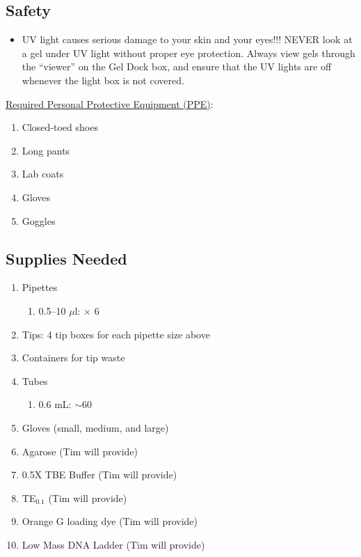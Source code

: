\documentclass[12pt, hidelinks]{article}
\begin{document}
	\subsection{Safety}
		\begin{itemize}
			\item UV light causes serious damage to your skin and your eyes!!!  NEVER look at a gel under UV light without proper eye protection. Always view gels through the ``viewer'' on the Gel Dock box, and ensure that the UV lights are off whenever the light box is not covered.
		\end{itemize}

	\underline{Required Personal Protective Equipment (PPE)}:
		\begin{enumerate}
			\item Closed-toed shoes
			\item Long pants
			\item Lab coats
			\item Gloves
			\item Goggles
		\end{enumerate}	


	\subsection{Supplies Needed}
		\begin{enumerate}
			\item Pipettes
				\begin{enumerate}
					\item 0.5--10 $\mu$l: $\times$ 6
				\end{enumerate}
			\item Tips: 4 tip boxes for each pipette size above	
			\item Containers for tip waste
			\item Tubes
				\begin{enumerate}
					\item 0.6 mL: $\sim$60
				\end{enumerate}	
			\item Gloves (small, medium, and large)
			\item Agarose (Tim will provide)
			\item 0.5X TBE Buffer (Tim will provide)
			\item TE$_{0.1}$ (Tim will provide)
			\item Orange G loading dye (Tim will provide)
			\item Low Mass DNA Ladder (Tim will provide) 
		\end{enumerate}
\end{document}
